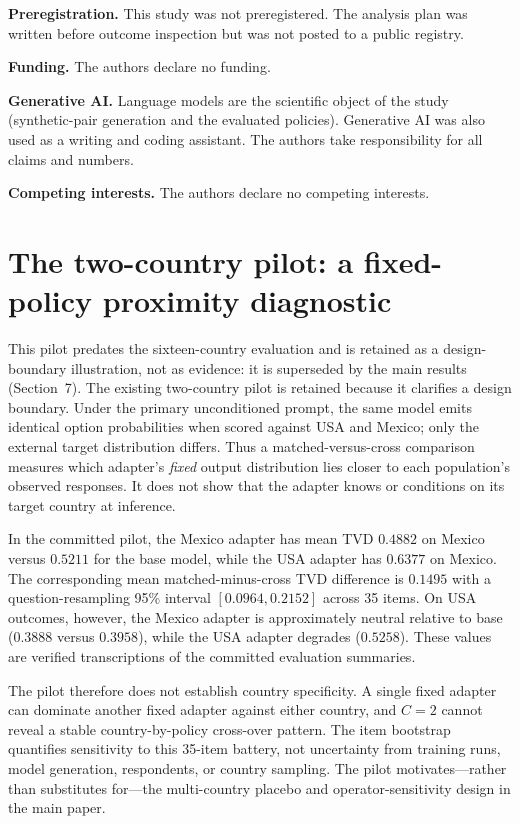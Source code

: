 \documentclass[10pt,letterpaper]{article}
\begin{document}
\noindent\textbf{Preregistration.} This study was not preregistered. The analysis plan was written before outcome inspection but was not posted to a public registry.

\noindent\textbf{Funding.} The authors declare no funding.

\noindent\textbf{Generative AI.} Language models are the scientific object of the study (synthetic-pair generation and the evaluated policies). Generative AI was also used as a writing and coding assistant. The authors take responsibility for all claims and numbers.

\noindent\textbf{Competing interests.} The authors declare no competing interests.

\newpage
\appendix
\section{The two-country pilot: a fixed-policy proximity diagnostic}
This pilot predates the sixteen-country evaluation and is retained as a design-boundary illustration, not as evidence: it is superseded by the main results (Section~7). The existing two-country pilot is retained because it clarifies a design boundary. Under the primary unconditioned prompt, the same model emits identical option probabilities when scored against USA and Mexico; only the external target distribution differs. Thus a matched-versus-cross comparison measures which adapter's \emph{fixed} output distribution lies closer to each population's observed responses. It does not show that the adapter knows or conditions on its target country at inference.

In the committed pilot, the Mexico adapter has mean TVD $0.4882$ on Mexico versus $0.5211$ for the base model, while the USA adapter has $0.6377$ on Mexico. The corresponding mean matched-minus-cross TVD difference is $0.1495$ with a question-resampling 95\% interval $[0.0964,0.2152]$ across 35 items. On USA outcomes, however, the Mexico adapter is approximately neutral relative to base ($0.3888$ versus $0.3958$), while the USA adapter degrades ($0.5258$). These values are verified transcriptions of the committed evaluation summaries.

The pilot therefore does not establish country specificity. A single fixed adapter can dominate another fixed adapter against either country, and $C=2$ cannot reveal a stable country-by-policy cross-over pattern. The item bootstrap quantifies sensitivity to this 35-item battery, not uncertainty from training runs, model generation, respondents, or country sampling. The pilot motivates---rather than substitutes for---the multi-country placebo and operator-sensitivity design in the main paper.
\end{document}
